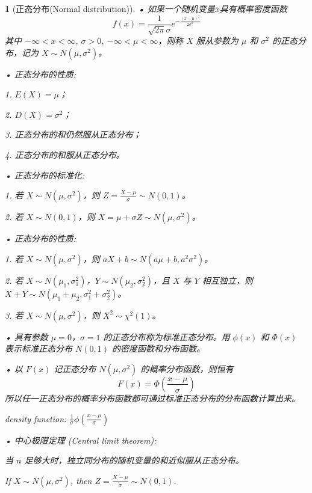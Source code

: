 \documentclass[UTF8]{report}
\theoremstyle{MyLineTheoremStyle} %
\theoremstyle{MyBlockTheoremStyle} %
\theoremstyle{MySubsubsectionStyle} %
\newtheorem{definition}{}
\begin{document}
\begin{definition}[正态分布(Normal distribution)]
    • 如果一个随机变量\(x\)具有概率密度函数
    \[
    f(x) = \frac{1}{\sqrt{2\pi}\sigma} e^{-\frac{(x - \mu)^2}{2\sigma^2}}
    \]
    其中 \(-\infty < x < \infty\), \(\sigma > 0\), \(-\infty < \mu < \infty\)，则称 \(X\) 服从参数为 \(\mu\) 和 \(\sigma^2\) 的正态分布，记为 \(X \sim N(\mu, \sigma^2)\)。\par
    • 正态分布的性质: \par
    1. \(E(X) = \mu\)；\par
    2. \(D(X) = \sigma^2\)；\par
    3. 正态分布的和仍然服从正态分布；\par
    4. 正态分布的和服从正态分布。\par
    • 正态分布的标准化: \par
    1. 若 \(X \sim N(\mu, \sigma^2)\)，则 \(Z = \frac{X - \mu}{\sigma} \sim N(0, 1)\)。\par
    2. 若 \(X \sim N(0, 1)\)，则 \(X = \mu + \sigma Z \sim N(\mu, \sigma^2)\)。\par
    • 正态分布的性质: \par
    1. 若 \(X \sim N(\mu, \sigma^2)\)，则 \(aX + b \sim N(a\mu + b, a^2\sigma^2)\)。\par
    2. 若 \(X \sim N(\mu_1, \sigma_1^2)\)，\(Y \sim N(\mu_2, \sigma_2^2)\)，且 \(X\) 与 \(Y\) 相互独立，则 \(X + Y \sim N(\mu_1 + \mu_2, \sigma_1^2 + \sigma_2^2)\)。\par
    3. 若 \(X \sim N(\mu, \sigma^2)\)，则 \(X^2 \sim \chi^2(1)\)。

    • 具有参数 \(\mu = 0\)，\(\sigma = 1\) 的正态分布称为标准正态分布。用 \(\phi(x)\) 和 \(\Phi(x)\) 表示标准正态分布 \(N(0, 1)\) 的密度函数和分布函数。\par
    • 以 \(F(x)\) 记正态分布 \(N(\mu, \sigma^2)\) 的概率分布函数，则恒有
    \[
    F(x) = \Phi\left(\frac{x - \mu}{\sigma}\right)
    \]
    所以任一正态分布的概率分布函数都可通过标准正态分布的分布函数计算出来。\par
    density function: \(\frac{1}{\sigma}\phi\left(\frac{x-\mu}{\sigma}\right)\)\par
    • 中心极限定理 (Central limit theorem): \par
    当 \(n\) 足够大时，独立同分布的随机变量的和近似服从正态分布。\par
    If \(X \sim N(\mu, \sigma^2)\), then \(Z = \frac{X - \mu}{\sigma} \sim N(0, 1)\). 
\end{definition}
\end{document}
